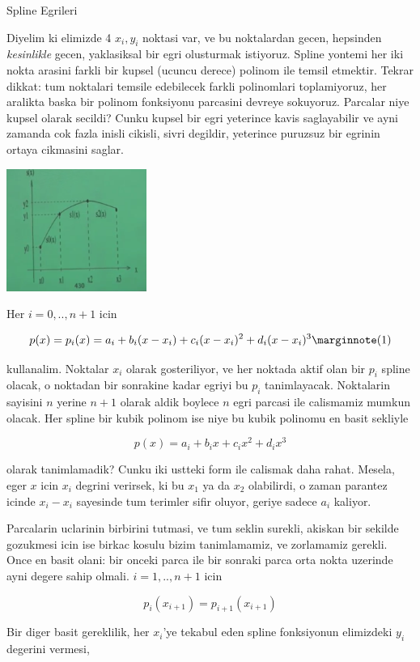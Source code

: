 \documentclass[12pt,fleqn]{article}\usepackage{../common}
\begin{document}
Spline Egrileri

Diyelim ki elimizde 4 $x_i,y_i$ noktasi var, ve bu noktalardan gecen,
hepsinden {\em kesinlikle} gecen, yaklasiksal bir egri olusturmak
istiyoruz. Spline yontemi her iki nokta arasini farkli bir kupsel (ucuncu
derece) polinom ile temsil etmektir. Tekrar dikkat: tum noktalari temsile
edebilecek farkli polinomlari toplamiyoruz, her aralikta baska bir polinom
fonksiyonu parcasini devreye sokuyoruz. Parcalar niye kupsel olarak
secildi? Cunku kupsel bir egri yeterince kavis saglayabilir ve ayni zamanda
cok fazla inisli cikisli, sivri degildir, yeterince puruzsuz bir egrinin
ortaya cikmasini saglar.

\includegraphics[height=4cm]{spline1.png}

Her $i=0,..,n+1$ icin 

$$ p(x) = p_i(x) = a_i + b_i(x-x_i) + c_i(x-x_i)^2 + d_i(x-x_i)^3
\mlabel{1}
$$

kullanalim. Noktalar $x_i$ olarak gosteriliyor, ve her noktada aktif olan
bir $p_i$ spline olacak, o noktadan bir sonrakine kadar egriyi bu $p_i$
tanimlayacak. Noktalarin sayisini $n$ yerine $n+1$ olarak aldik boylece $n$
egri parcasi ile calismamiz mumkun olacak. Her spline bir kubik polinom ise
niye bu kubik polinomu en basit sekliyle

$$ p(x) = a_i + b_ix + c_ix^2 + d_ix^3 $$

olarak tanimlamadik? Cunku iki ustteki form ile calismak daha
rahat. Mesela, eger $x$ icin $x_i$ degrini verirsek, ki bu $x_1$ ya da
$x_2$ olabilirdi, o zaman parantez icinde $x_i - x_i$ sayesinde tum terimler sifir
oluyor, geriye sadece $a_i$ kaliyor. 

Parcalarin uclarinin birbirini tutmasi, ve tum seklin surekli, akiskan bir
sekilde gozukmesi icin ise birkac kosulu bizim tanimlamamiz, ve zorlamamiz
gerekli. Once en basit olani: bir onceki parca ile bir sonraki parca
orta nokta uzerinde ayni degere sahip olmali. $i=1,..,n+1$ icin

$$ p_i (x_{i+1}) = p_{i+1}(x_{i+1}) $$

Bir diger basit gereklilik, her $x_i$'ye tekabul eden spline fonksiyonun
elimizdeki $y_i$ degerini vermesi,
\end{document}
